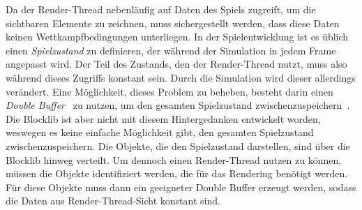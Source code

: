 Da der Render-Thread nebenläufig auf Daten des Spiels zugreift, um die sichtbaren Elemente zu zeichnen, muss sichergestellt werden, dass diese Daten keinen Wettkampfbedingungen unterliegen. In der Spielentwicklung ist es üblich einen \emph{Spielzustand} zu definieren, der während der Simulation in jedem Frame angepasst wird. Der Teil des Zustands, den der Render-Thread nutzt, muss also während dieses Zugriffs konstant sein. Durch die Simulation wird dieser allerdings verändert. Eine Möglichkeit, dieses Problem zu beheben, besteht darin einen \emph{Double Buffer}~\cite[S.~143]{Nystrom2015} zu nutzen, um den gesamten Spielzustand zwischenzuspeichern~\cite{Tatarchuk2014}. Die Blocklib ist aber nicht mit diesem Hintergedanken entwickelt worden, weswegen es keine einfache Möglichkeit gibt, den gesamten Spielzustand zwischenzuspeichern. Die Objekte, die den Spielzustand darstellen, sind über die Blocklib hinweg verteilt. Um dennoch einen Render-Thread nutzen zu können, müssen die Objekte identifiziert werden, die für das Rendering benötigt werden. Für diese Objekte muss dann ein geeigneter Double Buffer erzeugt werden, sodass die Daten aus Render-Thread-Sicht konstant sind.


